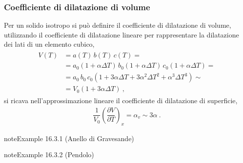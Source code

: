 \documentclass[letterpaper,10pt,italian]{jupyterBook}
\begin{document}
\subsubsection{Coefficiente di dilatazione di volume}
\label{\detokenize{ch/thermodynamics/elastic-solid-1d:coefficiente-di-dilatazione-di-volume}}
\sphinxAtStartPar
Per un solido isotropo si può definire il coefficiente di dilatazione di volume, utilizzando il coefficiente di dilatazione lineare per rappresentare la dilatazione dei lati di un elemento cubico,
\begin{equation*}
\begin{split}\begin{aligned}
  V(T)
  & = a(T) \, b(T) \, c(T) = \\
  & = a_0 (1 + \alpha \Delta T) \, b_0 (1 + \alpha \Delta T) \, c_0 (1+\alpha \Delta T) = \\ 
  & = a_0 \, b_0 \, c_0 (1 + 3 \alpha \Delta T + 3 \alpha^2 \Delta T^2 +  \alpha^3 \Delta T^3) \sim \\
  & = V_0 ( 1 + 3 \alpha \Delta T ) \ , 
\end{aligned}\end{split}
\end{equation*}
\sphinxAtStartPar
si ricava nell’approssimazione lineare il coefficiente di dilatazione di superficie,
\begin{equation*}
\begin{split} \dfrac{1}{V_0}\left(\dfrac{\partial V}{\partial T}\right)_x = \alpha_v \sim 3 \alpha \ .\end{split}
\end{equation*}\label{ch/thermodynamics/elastic-solid-1d:thermodynamics:elastic-solid:gravesande}
\begin{sphinxadmonition}{note}{Example 16.3.1 (Anello di Gravesande)}



\sphinxAtStartPar
{\hyperref[\detokenize{ch/thermodynamics/foundation-experiments:thermodynamics:history:th-expansion:gravesande}]{}}
\end{sphinxadmonition}
\label{ch/thermodynamics/elastic-solid-1d:thermodynamics:elastic-solid:pendulum}
\begin{sphinxadmonition}{note}{Example 16.3.2 (Pendolo)}


\end{sphinxadmonition}
\label{ch/thermodynamics/elastic-solid-1d:thermodynamics:elastic-solid:interference}
\end{document}
